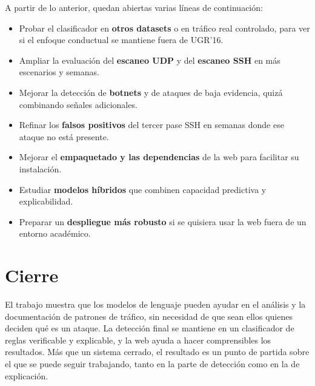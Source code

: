 A partir de lo anterior, quedan abiertas varias líneas de continuación:

\begin{itemize}
  \item Probar el clasificador en \textbf{otros datasets} o en tráfico real controlado, para ver si el enfoque conductual se mantiene fuera de UGR'16.
  \item Ampliar la evaluación del \textbf{escaneo UDP} y del \textbf{escaneo SSH} en más escenarios y semanas.
  \item Mejorar la detección de \textbf{botnets} y de ataques de baja evidencia, quizá combinando señales adicionales.
  \item Refinar los \textbf{falsos positivos} del tercer pase SSH en semanas donde ese ataque no está presente.
  \item Mejorar el \textbf{empaquetado y las dependencias} de la web para facilitar su instalación.
  \item Estudiar \textbf{modelos híbridos} que combinen capacidad predictiva y explicabilidad.
  \item Preparar un \textbf{despliegue más robusto} si se quisiera usar la web fuera de un entorno académico.
\end{itemize}

\section{Cierre}
\label{sec:concl_cierre}

El trabajo muestra que los modelos de lenguaje pueden ayudar en el análisis y la documentación de patrones de tráfico, sin necesidad de que sean ellos quienes deciden qué es un ataque. La detección final se mantiene en un clasificador de reglas verificable y explicable, y la web ayuda a hacer comprensibles los resultados. Más que un sistema cerrado, el resultado es un punto de partida sobre el que se puede seguir trabajando, tanto en la parte de detección como en la de explicación.
